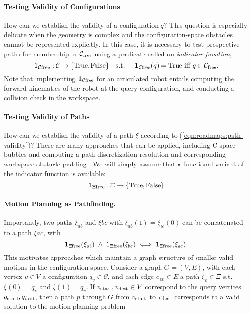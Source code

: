 \paragraph{Testing Validity of Configurations}
How can we establish the validity of a configuration $q$?
This question is especially delicate when the geometry is complex
and the configuration-space obstacles cannot be represented explicitly.
In this case,
it is necessary to test prospective paths
for membership in $\mathcal{C}_{\mbox{\scriptsize free}}$ using a predicate
called an \emph{indicator function},
\begin{equation}
   \mathbf{1}_{\mathcal{C}\mbox{\scriptsize free}} : \mathcal{C} \rightarrow
      \{ \mbox{True}, \mbox{False} \} 
   \mbox{\quad s.t. \quad}
   \mathbf{1}_{\mathcal{C}\mbox{\scriptsize free}}(q) = \mbox{True} \mbox{ iff } q \in \mathcal{C}_{\mbox{\scriptsize free}}.
\end{equation}
Note that implementing $\mathbf{1}_{\mathcal{C}\mbox{\scriptsize free}}$ for an articulated robot
entails computing the forward kinematics of the robot at the
query configuration,
and conducting a collision check in the workspace.

\paragraph{Testing Validity of Paths}
How can we establish the validity of a path $\xi$
according to (\ref{eqn:roadmaps:path-validity})?
There are many approaches that can be applied,
including C-space bubbles \citep{quinlan1994modification}
and computing a path discretization resolution and corresponding
workspace obstacle padding
\citep{barraquand1991distributedrepresentation}.
We will simply assume that a functional variant of the indicator
function is available:
\begin{equation}
   \mathbf{1}_{\Xi\mbox{\scriptsize free}} : \Xi \rightarrow
      \{ \mbox{True}, \mbox{False} \} 
\end{equation}

\paragraph{Motion Planning as Pathfinding.}
Importantly,
two paths $\xi_{ab}$ and $\xi{bc}$ with $\xi_{ab}(1) = \xi_{bc}(0)$
can be concatenated to a path $\xi{ac}$,
with
\begin{equation}
   \mathbf{1}_{\Xi\mbox{\scriptsize free}}(\xi_{ab})
   \;\land\;
   \mathbf{1}_{\Xi\mbox{\scriptsize free}}(\xi_{bc})
   \iff
   \mathbf{1}_{\Xi\mbox{\scriptsize free}}(\xi_{ac}).
\end{equation}
This motivates approaches which maintain a graph structure of
smaller valid motions in the configuration space.
Consider a graph $G = (V,E)$,
with each vertex $v \in V$ a configuration $q_v \in \mathcal{C}$,
and each edge $e_{uv} \in E$ a path $\xi_e \in \Xi$
s.t. $\xi(0) = q_u$ and $\xi(1) = q_v$.
If $v_{\mbox{\scriptsize start}}, v_{\mbox{\scriptsize dest}} \in V$
correspond to the query vertices $q_{\mbox{\scriptsize start}}, q_{\mbox{\scriptsize dest}}$,
then a path $p$ through $G$ from
$v_{\mbox{\scriptsize start}}$ to $v_{\mbox{\scriptsize dest}}$
corresponds to a valid solution to the motion planning problem.


